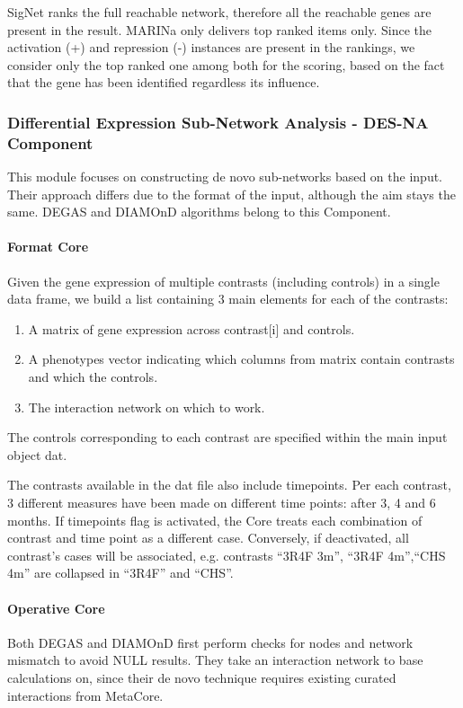 SigNet ranks the full reachable network, therefore all the reachable genes are present in the result. MARINa only delivers top ranked items only. Since the activation (+) and repression (-) instances are present in the rankings, we consider only the top ranked one among both for the scoring, based on the fact that the gene has been identified regardless its influence.
\\

\subsubsection{Differential Expression Sub-Network Analysis - DES-NA Component}

This module focuses on constructing de novo sub-networks based on the input. Their approach differs due to the format of the input, although the aim stays the same. DEGAS and DIAMOnD algorithms belong to this Component.

\paragraph{Format Core}
Given the gene expression of multiple contrasts (including controls) in a single data frame, we build a list containing 3 main elements for each of the contrasts: 

\begin{enumerate}
    \item A matrix of gene expression across contrast[i] and controls.
    \item A phenotypes vector indicating which columns from matrix contain contrasts and which the controls.
    \item The interaction network on which to work.
\end{enumerate}

The controls corresponding to each contrast are specified within the main input object dat.

The contrasts available in the dat file also include timepoints. Per each contrast, 3 different measures have been made on different time points: after 3, 4 and 6 months. If timepoints flag is activated, the Core treats each combination of contrast and time point as a different case. Conversely, if deactivated, all contrast’s cases will be associated, e.g. contrasts “3R4F 3m”, “3R4F 4m”,“CHS 4m” are collapsed in “3R4F” and “CHS”.

\paragraph{Operative Core}
\label{section:desna-o}
Both DEGAS and DIAMOnD first perform checks for nodes and network mismatch to avoid NULL results. They take an interaction network to base calculations on, since their de novo technique requires existing curated interactions from MetaCore.
\\

